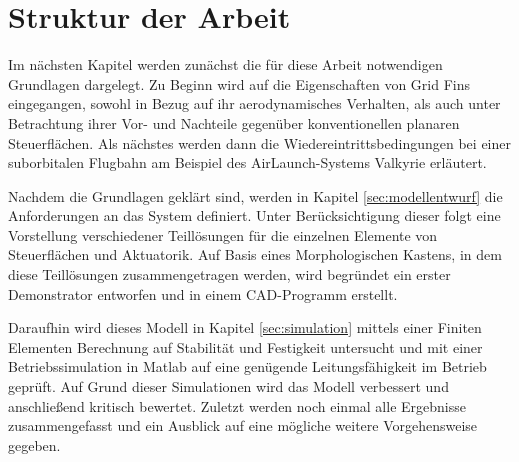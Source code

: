 \section{Struktur der Arbeit}
Im nächsten Kapitel werden zunächst die für diese Arbeit notwendigen Grundlagen dargelegt. Zu Beginn wird auf die Eigenschaften von Grid Fins eingegangen, sowohl in Bezug auf ihr aerodynamisches Verhalten, als auch unter Betrachtung ihrer Vor- und Nachteile gegenüber konventionellen planaren Steuerflächen. Als nächstes werden dann die Wiedereintrittsbedingungen bei einer suborbitalen Flugbahn am Beispiel des AirLaunch-Systems Valkyrie erläutert.

Nachdem die Grundlagen geklärt sind, werden in Kapitel \ref{sec:modellentwurf} die Anforderungen an das System definiert. Unter Berücksichtigung dieser folgt eine Vorstellung verschiedener Teillösungen für die einzelnen Elemente von Steuerflächen und Aktuatorik. Auf Basis eines Morphologischen Kastens, in dem diese Teillösungen zusammengetragen werden, wird begründet ein erster Demonstrator entworfen und in einem CAD-Programm erstellt.

Daraufhin wird dieses Modell in Kapitel \ref{sec:simulation} mittels einer Finiten Elementen Berechnung auf Stabilität und Festigkeit untersucht und mit einer Betriebssimulation in Matlab auf eine genügende
Leitungsfähigkeit im Betrieb geprüft. Auf Grund dieser Simulationen wird das Modell verbessert und anschließend kritisch bewertet.
Zuletzt werden noch einmal alle Ergebnisse zusammengefasst und ein Ausblick auf eine mögliche weitere Vorgehensweise gegeben.